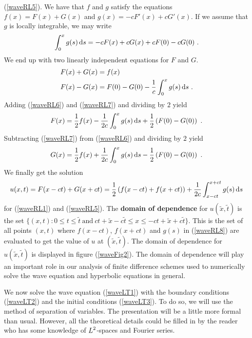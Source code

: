 (\ref{waveRL5}).  We have that $f$ and $g$ satisfy the equations
$f(x) = F(x) + G(x)$ and $g(x) = -c F'(x) + c G'(x)$.
If we assume that $g$ is locally integrable, we may write
\[
\int_0^x g(s)\,\mathrm{d}s = -c F(x) + c G(x) + c F(0) - c G(0) \ .
\]
We end up with two linearly independent equations for $F$ and $G$.
\begin{align}
F(x) + G(x) &= f(x) \label{waveRL6} \\
F(x) - G(x) &= F(0) - G(0) -\frac{1}{c} \int_0^x g(s)\,\mathrm{d}s \ . \label{waveRL7}
\end{align}
Adding (\ref{waveRL6}) and (\ref{waveRL7}) and dividing by $2$ yield
\[
F(x) = \frac{1}{2} f(x) - \frac{1}{2c} \int_0^x g(s)\,\mathrm{d}s +
\frac{1}{2} \left(F(0) - G(0)\right) \ .
\]
Subtracting (\ref{waveRL7}) from (\ref{waveRL6}) and dividing by $2$
yield
\[
G(x) = \frac{1}{2} f(x) + \frac{1}{2c} \int_0^x g(s)\,\mathrm{d}s -
\frac{1}{2} \left(F(0) - G(0)\right) \ .
\]
We finally get the solution
\begin{equation} \label{waveRL8}
u(x,t) = F(x-ct) + G(x+ct)
= \frac{1}{2} \left(f(x-ct) + f(x+ct)\right)
+ \frac{1}{2c} \int_{x-ct}^{x+ct} g(s)\,\mathrm{d}s
\end{equation}
for (\ref{waveRL1}) and (\ref{waveRL5}).  The
{\bfseries domain of dependence}
for $u(\tilde{x},\tilde{t})$ is the set 
$\{ (x,t) :  0 \leq t \leq \tilde{t} \ \text{and}
\ ct + \tilde{x} - c\tilde{t} \leq x \leq -ct + \tilde{x} + c\tilde{t} \}$.
This is the set of all points $(x,t)$ where $f(x-ct)$, $f(x+ct)$ and
$g(s)$ in (\ref{waveRL8}) are evaluated to get the value of 
$u$ at $(\tilde{x},\tilde{t})$.
The domain of dependence for $u(\tilde{x},\tilde{t})$ 
is displayed in figure (\ref{waveFig2}).  The domain of dependence
will play an important role in our analysis of finite difference
schemes used to numerically solve the wave equation and hyperbolic
equations in general. 


We now solve the wave equation (\ref{waveLT1}) with the boundary
conditions (\ref{waveLT2}) and the initial conditions (\ref{waveLT3}).
To do so, we will use the method of separation of variables.
The presentation will be a little more formal than usual.  However,
all the theoretical details could be filled in by the reader who has some
knowledge of $\displaystyle L^2$-spaces and Fourier series.

